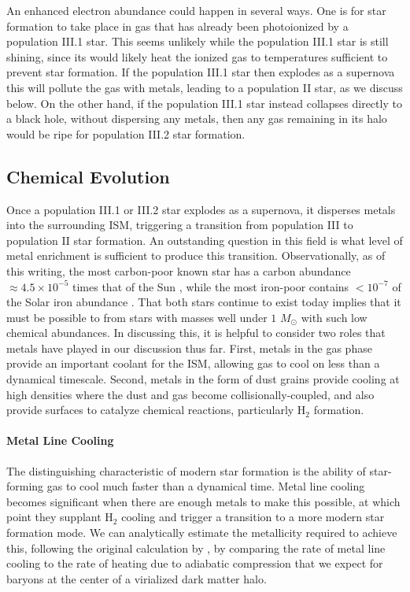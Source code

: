 An enhanced electron abundance could happen in several ways. One is for star formation to take place in gas that has already been photoionized by a population III.1 star. This seems unlikely while the population III.1 star is still shining, since its would likely heat the ionized gas to temperatures sufficient to prevent star formation. If the population III.1 star then explodes as a supernova this will pollute the gas with metals, leading to a population II star, as we discuss below. On the other hand, if the population III.1 star instead collapses directly to a black hole, without dispersing any metals, then any gas remaining in its halo would be ripe for population III.2 star formation.

\subsection{Chemical Evolution}
\label{ssec:chemevol}

Once a population III.1 or III.2 star explodes as a supernova, it disperses metals into the surrounding ISM, triggering a transition from population III to population II star formation. An outstanding question in this field is what level of metal enrichment is sufficient to produce this transition. Observationally, as of this writing, the most carbon-poor known star has a carbon abundance $\approx 4.5 \times 10^{-5}$ times that of the Sun \citep{caffau11a}, while the most iron-poor contains $<10^{-7}$ of the Solar iron abundance \citep{keller14a}. That both stars continue to exist today implies that it must be possible to from stars with masses well under $1$ $M_\odot$ with such low chemical abundances. In discussing this, it is helpful to consider two roles that metals have played in our discussion thus far. First, metals in the gas phase provide an important coolant for the ISM, allowing gas to cool on less than a dynamical timescale. Second, metals in the form of dust grains provide cooling at high densities where the dust and gas become collisionally-coupled, and also provide surfaces to catalyze chemical reactions, particularly H$_2$ formation.

\paragraph{Metal Line Cooling}

The distinguishing characteristic of modern star formation is the ability of star-forming gas to cool much faster than a dynamical time. Metal line cooling becomes significant when there are enough metals to make this possible, at which point they supplant H$_2$ cooling and trigger a transition to a more modern star formation mode. We can analytically estimate the metallicity required to achieve this, following the original calculation by \citet{bromm01a}, by comparing the rate of metal line cooling to the rate of heating due to adiabatic compression that we expect for baryons at the center of a virialized dark matter halo.

